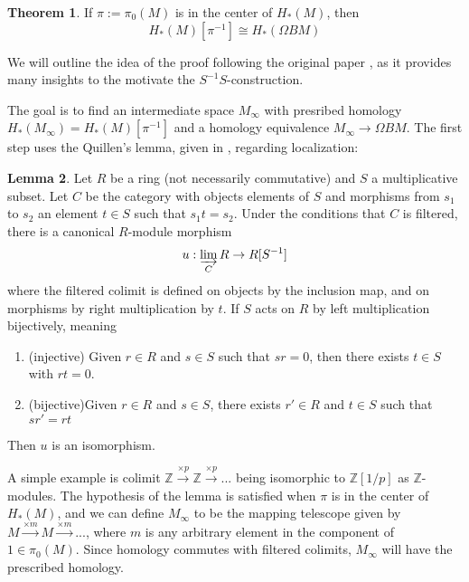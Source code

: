 \documentclass{article}
\theoremstyle{definition}
\newtheorem{theorem}{Theorem}[section]
\theoremstyle{definition}
\theoremstyle{definition}
\theoremstyle{definition}
\theoremstyle{definition}
\newtheorem{lemma}[theorem]{Lemma}
\theoremstyle{definition}
\theoremstyle{definition}
\begin{document}
\begin{tcolorbox}[colback=red!5!white,colframe=red!30!white]
\begin{theorem}
If $\pi:=\pi_0(M)$ is in the center of $H_*(M)$, then 
\[H_*(M)[\pi^{-1}]\cong H_*(\Omega BM)\]
\end{theorem}
\end{tcolorbox}
We will outline the idea of the proof following the original paper \cite{MS}, as it provides many insights to the motivate the $S^{-1}S$-construction.

The goal is to  find an intermediate space $M_{\infty}$ with presribed homology $H_*(M_{\infty})= H_*(M)[\pi^{-1}]$ and a homology equivalence $M_{\infty}\to \Omega BM$. The first step uses the Quillen's lemma, given in \cite{QGc}, regarding localization:

\begin{tcolorbox}
\begin{lemma}
Let $R$ be a ring (not necessarily commutative) and $S$ a multiplicative subset. Let $C$ be the category with objects elements of $S$ and morphisms from $s_1$ to $s_2$ an element $t\in S$ such that $s_1t=s_2$. Under the conditions that $C$ is filtered, there is a canonical $R$-module morphism 
\[u:\varinjlim_{C} R \to R[S^{-1}] \]
where the filtered colimit is defined on objects by the inclusion map, and on morphisms by right multiplication by $t$. If $S$ acts on $R$ by left multiplication bijectively, meaning
\begin{enumerate}
    \item (injective) Given $r\in R$ and $s\in S$ such that $sr=0$, then there exists $t\in S$ with $rt=0$.
    \item (bijective)Given $r\in R$ and $s\in S$, there exists $r'\in R$ and $t\in S$ such that $sr'=rt$
\end{enumerate}
Then $u$ is an isomorphism. 
\end{lemma}
\end{tcolorbox}
A simple example is colimit $\mathbb{Z}\xrightarrow{\times p}\mathbb{Z}\xrightarrow{\times p}...$ being isomorphic to $\mathbb{Z}[1/p]$ as $\mathbb{Z}$-modules. The hypothesis of the lemma is satisfied when $\pi$ is in the center of $H_*(M)$, and we can define $M_{\infty}$ to be the mapping telescope given by $M\xrightarrow{\times m}M\xrightarrow{\times m}...$, where $m$ is any arbitrary element in the component of $1\in \pi_0(M)$. Since homology commutes with filtered colimits, $M_{\infty}$ will have the prescribed homology. 
\end{document}
